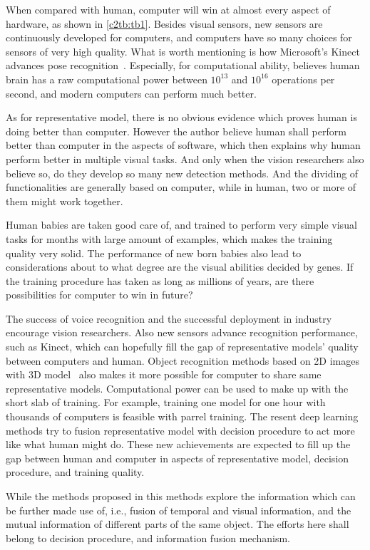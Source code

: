 When compared with human, computer will win at almost every aspect of hardware, as shown in \ref{c2tb:tb1}. Besides visual sensors, new sensors are continuously developed for computers, and computers have so many choices for sensors of very high quality. What is worth mentioning is how Microsoft's Kinect advances pose recognition~\cite{knct}. Especially, for computational ability, \cite{bpw} believes human brain has a raw computational power between $10^{13}$ and $10^{16}$ operations per second, and modern computers can perform much better.
 
 As for representative model, there is no obvious evidence which proves human is doing better than computer. However the author believe human shall perform better than computer in the aspects of software, which then explains why human perform better in multiple visual tasks. And only when the vision researchers also believe so, do they develop  so many new detection methods. And the  dividing of functionalities  are generally based on computer, while in human, two or more of them might work together.

Human babies are taken good care of, and trained to perform very simple visual tasks for months with large amount of examples, which makes the training quality very solid. The performance of new born babies also lead to considerations about to what degree are the visual abilities decided by genes. If the training procedure has taken as long as millions of years, are there possibilities for computer to win in future?

The success of voice recognition and the successful deployment in industry~\cite{siri} encourage vision researchers. Also new sensors advance recognition performance, such as Kinect, which can hopefully fill the gap of representative models' quality between computers and human. Object recognition methods based on 2D images with 3D model~\cite{r3d} also makes it more possible for computer to share same representative models.  Computational power can be used to make up with the short slab of training. For example, training one model for one hour with thousands of computers is feasible with parrel training. The resent deep learning~\cite{dlearn} methods try to fusion representative model with decision procedure to act more like what human might do. These new achievements are expected to fill up the gap between human and computer in aspects of representative model, decision procedure, and training quality.



While the methods proposed in this methods explore the information which can be further made use of, i.e., fusion of temporal and visual information, and the mutual information of different parts of the same object. The efforts here shall belong to decision procedure, and information fusion mechanism.

